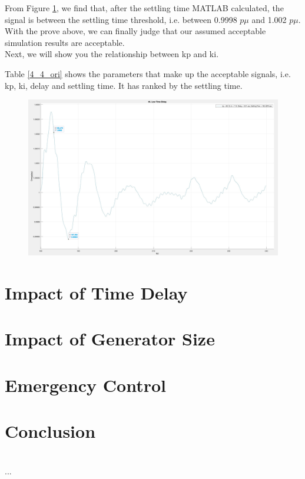 \documentclass{report}
\begin{document}
From Figure \textcolor{red}{\ref{4_4_1_result4}}, we find that, after the settling time MATLAB calculated, the signal is between the settling time threshold, i.e. between 0.9998 $p\mu$ and 1.002 $p\mu$. \\

With the prove above, we can finally judge that our assumed acceptable simulation results are acceptable. \\

Next, we will show you the relationship between kp and ki. \\



\label{4_4_ori}




 Table \textcolor{red}{\ref{4_4_ori}} shows the parameters that make up the acceptable signals, i.e. kp, ki, delay and settling time. It has ranked by the settling time. 


\begin{figure}[htbp]
\centering
\includegraphics[width = \textwidth]{figure/4_4_1_result4.jpeg}
\caption{}
\label{4_4_1_result4}
\end{figure}











\chapter{Impact of Time Delay}
\label{Chapter5}



\chapter{Impact of Generator Size}
\label{Chapter6}


\chapter{Emergency Control}
\label{Chapter7}


\chapter{Conclusion}
\label{Chapter8}


\appendix
\chapter{}
...
%
%
\end{document}
